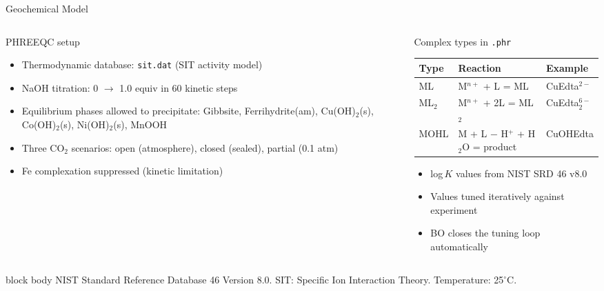 \documentclass[8pt,aspectratio=169]{beamer}
\begin{document}
\begin{frame}{Geochemical Model}
  \begin{columns}[T]
    \begin{column}{0.48\textwidth}
      \begin{block}{PHREEQC setup}
        \begin{itemize}
          \setlength{\itemsep}{4pt}
          \item Thermodynamic database: \texttt{sit.dat} (SIT activity model)
          \item NaOH titration: 0 $\to$ 1.0 equiv in 60 kinetic steps
          \item Equilibrium phases allowed to precipitate:
                Gibbsite, Ferrihydrite(am), Cu(OH)$_2$(s),
                Co(OH)$_2$(s), Ni(OH)$_2$(s), MnOOH
          \item Three CO$_2$ scenarios: open (atmosphere), closed
                (sealed), partial (0.1 atm)
          \item Fe complexation suppressed (kinetic limitation)
        \end{itemize}
      \end{block}
    \end{column}
    \begin{column}{0.48\textwidth}
      \begin{block}{Complex types in \texttt{.phr}}
        \small
        \renewcommand{\arraystretch}{1.3}
        \begin{tabular}{@{}lll@{}}
          \toprule
          \textbf{Type} & \textbf{Reaction} & \textbf{Example} \\
          \midrule
          ML    & M$^{n+}$ + L = ML    & CuEdta$^{2-}$ \\
          ML$_2$ & M$^{n+}$ + 2L = ML$_2$ & CuEdta$_2^{6-}$ \\
          MOHL  & M + L $-$ H$^+$ + H$_2$O = product & CuOHEdta \\
          \bottomrule
        \end{tabular}
        \vspace{6pt}
        \begin{itemize}
          \setlength{\itemsep}{3pt}
          \item log$\,K$ values from NIST SRD 46 v8.0
          \item Values tuned iteratively against experiment
          \item BO closes the tuning loop automatically
        \end{itemize}
      \end{block}
    \end{column}
  \end{columns}
  \vspace{4pt}
  \begin{beamercolorbox}[rounded=true, shadow=false, wd=\textwidth]{block body}
    \tiny
    NIST Standard Reference Database 46 Version 8.0. SIT: Specific Ion Interaction Theory. Temperature: 25$^\circ$C.
  \end{beamercolorbox}
\end{frame}
\end{document}
